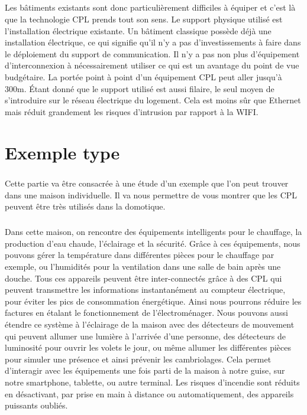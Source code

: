     \paragraph{}
Les bâtiments existants sont donc particulièrement difficiles à équiper et c’est là que la technologie CPL prends tout son sens.
Le support physique utilisé est l’installation électrique existante.
Un bâtiment classique possède déjà une installation électrique, ce qui signifie qu'il n'y a pas d’investissements à faire dans le déploiement du support de communication.
Il n’y a pas non plus d’équipement d’interconnexion à nécessairement utiliser ce qui est un avantage du point de vue budgétaire.
La portée point à point d’un équipement CPL peut aller jusqu’à 300m.
Étant donné que le support utilisé est aussi filaire, le seul moyen de s’introduire sur le réseau électrique du logement.
Cela est moins sûr que Ethernet mais réduit grandement les risques d’intrusion par rapport à la WIFI.



\chapter{Exemple type}
            \paragraph{}
Cette partie va être consacrée à une étude d’un exemple que l’on peut trouver dans une maison individuelle.
Il va nous permettre de vous montrer que les CPL peuvent être très utilisés dans la domotique.
            \paragraph{}
Dans cette maison, on rencontre des équipements intelligents pour le chauffage, la production d’eau chaude, l’éclairage et la sécurité.
Grâce à ces équipements, nous pouvons gérer la température dans différentes pièces pour le chauffage par exemple, ou l'humidités pour la ventilation dans une salle de bain après une douche.
Tous ces appareils peuvent être inter-connectés grâce à des CPL qui peuvent transmettre les informations instantanément au compteur électrique, pour éviter les pics de consommation énergétique.
Ainsi nous pourrons réduire les factures en étalant le fonctionnement de l'électroménager.
Nous pouvons aussi étendre ce système à l’éclairage de la maison avec des détecteurs de mouvement qui peuvent allumer une lumière à l’arrivée d’une personne,
des détecteurs de luminosité pour ouvrir les volets le jour, ou même allumer les différentes pièces pour simuler une présence et ainsi prévenir les cambriolages.
Cela permet d'interagir avec les équipements une fois parti de la maison à notre guise, sur notre smartphone, tablette, ou autre terminal.
Les risques d’incendie sont réduits en désactivant, par prise en main à distance ou automatiquement, des appareils puissants oubliés.


